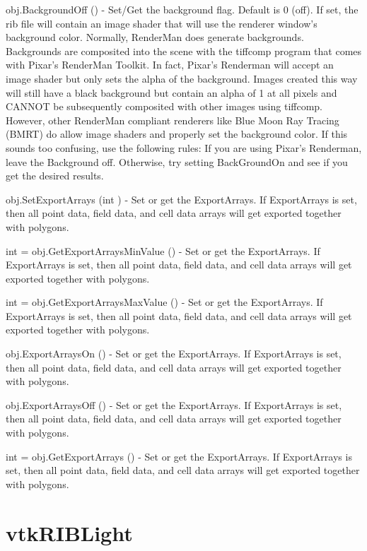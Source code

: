\begin{DoxyItemize}
\item {\ttfamily obj.\-Background\-Off ()} -\/ Set/\-Get the background flag. Default is 0 (off). If set, the rib file will contain an image shader that will use the renderer window's background color. Normally, Render\-Man does generate backgrounds. Backgrounds are composited into the scene with the tiffcomp program that comes with Pixar's Render\-Man Toolkit. In fact, Pixar's Renderman will accept an image shader but only sets the alpha of the background. Images created this way will still have a black background but contain an alpha of 1 at all pixels and C\-A\-N\-N\-O\-T be subsequently composited with other images using tiffcomp. However, other Render\-Man compliant renderers like Blue Moon Ray Tracing (B\-M\-R\-T) do allow image shaders and properly set the background color. If this sounds too confusing, use the following rules\-: If you are using Pixar's Renderman, leave the Background off. Otherwise, try setting Back\-Ground\-On and see if you get the desired results.  
\item {\ttfamily obj.\-Set\-Export\-Arrays (int )} -\/ Set or get the Export\-Arrays. If Export\-Arrays is set, then all point data, field data, and cell data arrays will get exported together with polygons.  
\item {\ttfamily int = obj.\-Get\-Export\-Arrays\-Min\-Value ()} -\/ Set or get the Export\-Arrays. If Export\-Arrays is set, then all point data, field data, and cell data arrays will get exported together with polygons.  
\item {\ttfamily int = obj.\-Get\-Export\-Arrays\-Max\-Value ()} -\/ Set or get the Export\-Arrays. If Export\-Arrays is set, then all point data, field data, and cell data arrays will get exported together with polygons.  
\item {\ttfamily obj.\-Export\-Arrays\-On ()} -\/ Set or get the Export\-Arrays. If Export\-Arrays is set, then all point data, field data, and cell data arrays will get exported together with polygons.  
\item {\ttfamily obj.\-Export\-Arrays\-Off ()} -\/ Set or get the Export\-Arrays. If Export\-Arrays is set, then all point data, field data, and cell data arrays will get exported together with polygons.  
\item {\ttfamily int = obj.\-Get\-Export\-Arrays ()} -\/ Set or get the Export\-Arrays. If Export\-Arrays is set, then all point data, field data, and cell data arrays will get exported together with polygons.  
\end{DoxyItemize}\hypertarget{vtkhybrid_vtkriblight}{}\section{vtk\-R\-I\-B\-Light}\label{vtkhybrid_vtkriblight}
